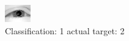 \begin{figure}[h!]
\begin{center}
\includegraphics[width=0.60\columnwidth]{figures/ID2240_class_1_target_2.png}
\end{center}
\caption{ Classification: 1 actual target: 2}
\label{fig:ID2240_class_1_target_2}
\end{figure}
